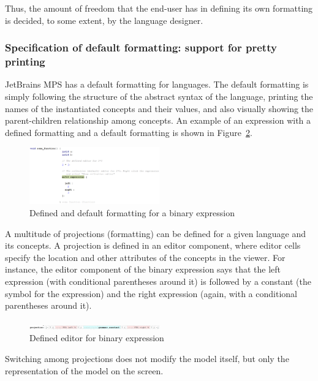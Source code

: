 \documentclass[preprint,numbers,10pt]{sigplanconf}
\begin{document}
Thus, the amount of freedom that the end-user has in defining its own formatting
is decided, to some extent, by the language designer.

\subsubsection{Specification of default formatting: support for pretty printing}
JetBrains MPS has a default formatting for languages. The default formatting is simply following
the structure of the abstract syntax of the language, printing the names of the instantiated concepts and
their values, and also visually showing the parent-children relationship among concepts.
An example of an expression with a defined formatting and
a default formatting is shown in Figure~\ref{fig:DefaultEditor}.

\begin{figure}[H]
	\centering
	\includegraphics[width=0.50\textwidth]{screens/DefaultEditor.png}
	\caption{Defined and default formatting for a binary expression}
	\label{fig:DefaultEditor}
\end{figure}

A multitude of projections (formatting) can be defined for a given language and its concepts.
A projection is defined in an editor component, where editor cells specify the location and other attributes
of the concepts in the viewer. For instance, the editor component of the binary expression
says that the left expression (with conditional parentheses around it) is followed by a constant (the
symbol for the expression) and the right expression (again, with a conditional parentheses around it).

\begin{figure}[H]
	\centering
	\includegraphics[width=0.50\textwidth]{screens/EditorMultiExpression.png}
	\caption{Defined editor for binary expression}
	\label{fig:DefaultEditor}
\end{figure}

Switching among projections does not modify the model itself, but only the representation of the model
on the screen.
\end{document}
